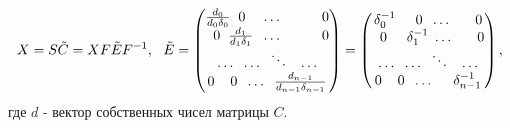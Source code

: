 \documentclass[a4paper]{article}
\theoremstyle{definition}
\begin{document}
    $$X = S \tilde{C} = X F\tilde{E}F^{-1},~~
    \tilde{E} = \begin{pmatrix}
          \frac{d_0}{d_0\delta_0} \hspace*{2mm} 0 \hspace*{4mm} \ldots \hspace*{10mm} 0 \\
          \hspace*{2mm} 0 \hspace*{2mm} \frac{d_1}{d_1\delta_1} \hspace*{2mm} \ldots \hspace*{10mm} 0 \\
          \ldots \hspace*{2mm} \ldots \hspace*{2mm} \ddots \hspace*{3mm} \ldots \\
          0 \hspace*{4mm} 0 \hspace*{2mm} \ldots \hspace*{2mm} \frac{d_{n-1}}{d_{n-1}\delta_{n-1}}
        \end{pmatrix} = \begin{pmatrix}
          \delta_0^{-1} \hspace*{5mm} 0 \hspace*{2mm} \ldots \hspace*{6mm} 0 \\
          \hspace*{2mm} 0 \hspace*{5mm} \delta_1^{-1} \hspace*{1mm} \ldots \hspace*{6mm} 0 \\
          \ldots \hspace*{2mm} \ldots \hspace*{2mm} \ddots \hspace*{3mm} \ldots \\
          0 \hspace*{4mm} 0 \hspace*{2mm} \ldots \hspace*{5mm} \delta_{n-1}^{-1}
        \end{pmatrix},
    $$ где $d$ - вектор собственных чисел матрицы $C$.
\end{document}
